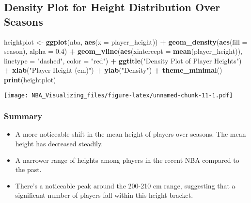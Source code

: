\documentclass[
]{book}
\newenvironment{Shaded}{\begin{snugshade}}{\end{snugshade}}
\newcommand{\AttributeTok}[1]{\textcolor[rgb]{0.13,0.29,0.53}{#1}}
\newcommand{\FloatTok}[1]{\textcolor[rgb]{0.00,0.00,0.81}{#1}}
\newcommand{\FunctionTok}[1]{\textcolor[rgb]{0.13,0.29,0.53}{\textbf{#1}}}
\newcommand{\NormalTok}[1]{#1}
\newcommand{\OtherTok}[1]{\textcolor[rgb]{0.56,0.35,0.01}{#1}}
\newcommand{\SpecialCharTok}[1]{\textcolor[rgb]{0.81,0.36,0.00}{\textbf{#1}}}
\newcommand{\StringTok}[1]{\textcolor[rgb]{0.31,0.60,0.02}{#1}}
\begin{document}
\hypertarget{density-plot-for-height-distribution-over-seasons}{%
\subsection{Density Plot for Height Distribution Over Seasons}\label{density-plot-for-height-distribution-over-seasons}}

\begin{Shaded}
\begin{Highlighting}[]
\NormalTok{heightplot }\OtherTok{\textless{}{-}} \FunctionTok{ggplot}\NormalTok{(nba, }\FunctionTok{aes}\NormalTok{(}\AttributeTok{x =}\NormalTok{ player\_height)) }\SpecialCharTok{+}
    \FunctionTok{geom\_density}\NormalTok{(}\FunctionTok{aes}\NormalTok{(}\AttributeTok{fill =}\NormalTok{ season), }\AttributeTok{alpha =} \FloatTok{0.4}\NormalTok{) }\SpecialCharTok{+}
    \FunctionTok{geom\_vline}\NormalTok{(}\FunctionTok{aes}\NormalTok{(}\AttributeTok{xintercept =} \FunctionTok{mean}\NormalTok{(player\_height)),}
        \AttributeTok{linetype =} \StringTok{"dashed"}\NormalTok{, }\AttributeTok{color =} \StringTok{"red"}\NormalTok{) }\SpecialCharTok{+}
    \FunctionTok{ggtitle}\NormalTok{(}\StringTok{"Density Plot of Player Heights"}\NormalTok{) }\SpecialCharTok{+}
    \FunctionTok{xlab}\NormalTok{(}\StringTok{"Player Height (cm)"}\NormalTok{) }\SpecialCharTok{+} \FunctionTok{ylab}\NormalTok{(}\StringTok{"Density"}\NormalTok{) }\SpecialCharTok{+}
    \FunctionTok{theme\_minimal}\NormalTok{()}
\FunctionTok{print}\NormalTok{(heightplot)}
\end{Highlighting}
\end{Shaded}

\texttt{[image: NBA\_Visualizing\_files/figure-latex/unnamed-chunk-11-1.pdf]}

\hypertarget{summary}{%
\subsubsection{Summary}\label{summary}}

\begin{itemize}
\item
  A more noticeable shift in the mean height of players over seasons. The mean height has decreased steadily.
\item
  A narrower range of heights among players in the recent NBA compared to the past.
\item
  There's a noticeable peak around the 200-210 cm range, suggesting that a significant number of players fall within this height bracket.
\end{itemize}
\end{document}
